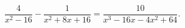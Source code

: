 \begin{ex}[type=equation]
	\begin{condition}
		$\dfrac{4}{x^2 - 16} - \dfrac{1}{x^2 +  8x + 16} = \dfrac{10}{x^3 - 16x - 4x^2 + 64}.$
	\end{condition}
\end{ex}